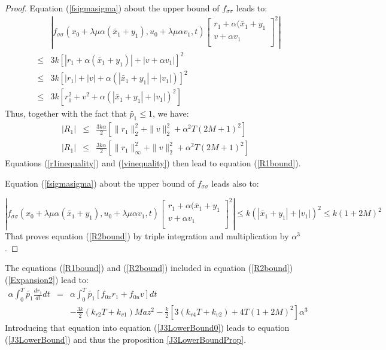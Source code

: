 \documentclass[a4paper,10pt]{article}
\begin{document}
\begin{proof}
    Equation (\ref{fsigmasigma}) about the upper bound of $f_{\sigma 
    \sigma}$ leads to:
   \begin{eqnarray*}
    &&  \left|f_{\sigma \sigma}(x_{0} + \lambda \mu\alpha(\tilde{x_{1}}+y_{1}),
	u_{0} + \lambda \mu \alpha v_{1},t)
	\left[\begin{array}
	{c}
	    r_{1} + \alpha(\tilde{x_{1}}+y_{1}  \\
	     v + \alpha v_{1} \\
	\end{array}\right]^{2}\right|\\
	&\leq & 3k[|r_{1}+\alpha(\tilde{x_{1}}+y_{1})| + |v+\alpha v_{1}|]^{2} \\
	&\leq & 3k[|r_{1}| + |v|+\alpha(|\tilde{x_{1}}+y_{1}| + |v_{1}|)]^{2} \\
	&\leq & 3k[r_{1}^{2} + v^{2}+\alpha(|\tilde{x_{1}}+y_{1}| + |v_{1}|)^{2}]
    \end{eqnarray*}
    Thus, together with the fact that $\tilde{p_{1}} \leq 1$, we have:
    \begin{eqnarray*}
       |R_{1}|& \leq &\frac{3k \alpha}{2}[\|r_{1}\|_{2}^{2} + \|v\|_{2}^{2}+ \alpha^{2}T(2M+1)^{2}]
      \\ |R_{1}| & \leq &\frac{3k \alpha}{2}[\|r_{1}\|_{\infty}^{2} + \|v\|_{2}^{2}+ \alpha^{2}T(2M+1)^{2}]      
   \end{eqnarray*}
   Equations (\ref{r1inequality}) and (\ref{vinequality}) then lead 
   to equation (\ref{R1bound}). 
   
   Equation (\ref{fsigmasigma}) about the upper bound of $f_{\sigma 
   \sigma}$ leads also to: 
 
\[
          \left|
                 f_{\sigma \sigma}(x_{0} + \lambda \mu\alpha(\tilde{x_{1}}+y_{1}),
             u_{0} + \lambda \mu \alpha v_{1},t)
             \left[\begin{array}
             {c}
                 r_{1} + \alpha(\tilde{x_{1}}+y_{1}  \\
                  v + \alpha v_{1} \\
             \end{array}\right]^{2}\right|
         \leq k(|\tilde{x_{1}}+y_{1}| + |v_{1}|)^{2} \leq k(1+2M)^{2}
\]
 That proves equation (\ref{R2bound}) by triple integration and 
 multiplication by $\alpha^{3}$.
 \end{proof}
The equations (\ref{R1bound}) and (\ref{R2bound}) included in 
equation (\ref{R2bound}) (\ref{Expansion2}) lead to:
\begin{eqnarray*}
    \alpha \int_{0}^{T}  \tilde{p_{1}} \frac{dr_{1}}{dt}dt  
   & = &\alpha \int_{0}^{T} \tilde{p_{1}}[f_{0x}r_{1} + f_{0u}v] dt \\
   && -\frac{3k}{2}(k_{r2}T + k_{v1})Ma z^{2}
   - \frac{k}{2}[3(k_{r4}T+k_{v2}) +4T(1+2M)^{2}]\alpha^{3}
\end{eqnarray*}
Introducing that equation into equation (\ref{J3LowerBound0}) leads 
to equation (\ref{J3LowerBound}) and thus the proposition 
\ref{J3LowerBoundProp}.
\end{document}
